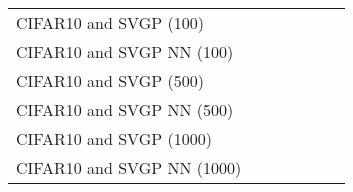 \begin{tabular}{l C{0.6\tblw} C{0.6\tblw} C{0.6\tblw} C{0.6\tblw} C{0.6\tblw}  C{0.6\tblw}}
\midrule
\sc CIFAR10 and SVGP (100) &  &  &  &  \\
\sc CIFAR10 and SVGP NN (100) &  &  &  &  \\
\sc CIFAR10 and SVGP (500) &  &  &  &  \\
\sc CIFAR10 and SVGP NN (500) &  &  &  &  \\
\sc CIFAR10 and SVGP (1000) &  &  &  &  \\
\sc CIFAR10 and SVGP NN (1000) &  &  &  &  \\
\bottomrule
\end{tabular}
